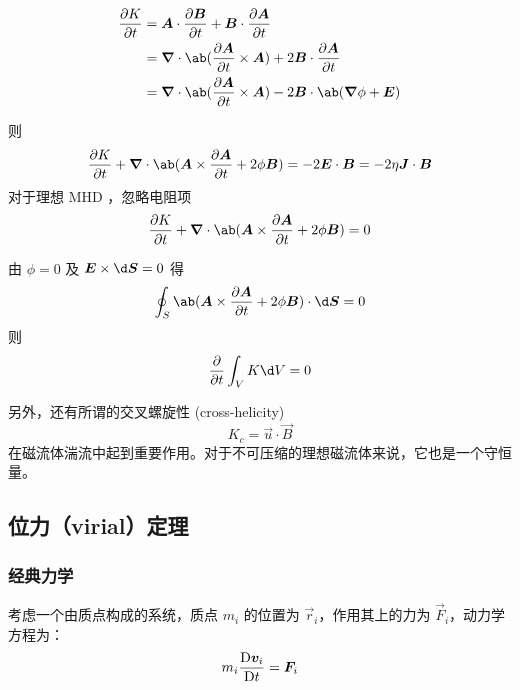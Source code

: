 \begin{equation}\begin{aligned}
\pdv{K}{t} &= \vec{A} \cdot \pdv{\vec{B}}{t}
+ \vec{B} \cdot \pdv{\vec{A}}{t} \\
&= \dive{\ab( \pdv{\vec{A}}{t} \times \vec{A} )}
+ 2 \vec{B} \cdot \pdv{\vec{A}}{t} \\
&= \dive{\ab( \pdv{\vec{A}}{t} \times \vec{A} )}
- 2 \vec{B} \cdot \ab(\grad{\phi} + \vec{E})
\end{aligned}\end{equation}

则
\begin{equation}
\pdv{K}{t} + \dive{\ab(
    \vec{A} \times \pdv{\vec{A}}{t} + 2 \phi \vec{B}
)} = - 2 \vec{E} \cdot \vec{B} = - 2 \eta \vec{J} \cdot \vec{B}
\end{equation}
对于理想 MHD ，忽略电阻项
\begin{equation}
\pdv{K}{t} + \dive{\ab(
    \vec{A} \times \pdv{\vec{A}}{t} + 2 \phi \vec{B}
)} = 0
\end{equation}

由 $\phi = 0$ 及 $\vec{E} \times \d \vec{S} = 0$ 得
\begin{equation}
    \oint_S \ab(
    \vec{A} \times \pdv{\vec{A}}{t} + 2 \phi \vec{B}
) \cdot \d \vec{S} = 0
\end{equation}
则
\begin{equation}
    \pdv{}{t} \int_V K \d V = 0
\end{equation}

另外，还有所谓的交叉螺旋性 (cross-helicity)
\begin{equation}
    K_c = \vec{u} \cdot \vec{B}
\end{equation}
在磁流体湍流中起到重要作用。对于不可压缩的理想磁流体来说，它也是一个守恒量。

\subsection{位力（virial）定理}

\subsubsection{经典力学}

考虑一个由质点构成的系统，质点 $m_i$ 的位置为 $\vec{r}_i$，作用其上的力为 $\vec{F}_i$，动力学方程为：
\begin{equation}
    m_i \mdv{\vec{v}_i}{t} = \vec{F}_i
\end{equation}

